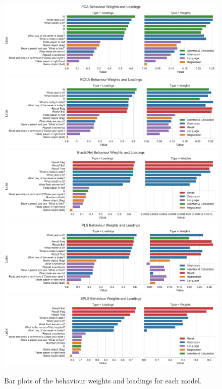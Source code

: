 \begin{figure}
\centering
\includegraphics[width=0.8\linewidth]{figures/regularization/adni/PCA behaviour weights and loadings}
\includegraphics[width=0.8\linewidth]{figures/regularization/adni/RCCA behaviour weights and loadings}
\includegraphics[width=0.8\linewidth]{figures/regularization/adni/ElasticNet behaviour weights and loadings}
\includegraphics[width=0.8\linewidth]{figures/regularization/adni/PLS behaviour weights and loadings}
\includegraphics[width=0.8\linewidth]{figures/regularization/adni/SPLS behaviour weights and loadings}
\caption{Bar plots of the behaviour weights and loadings for each model.}\label{fig:adni-beh}
\end{figure}

